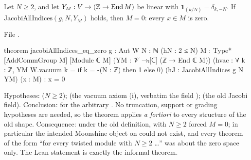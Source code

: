 \begin{theorem}\label{ch06:thm:defect}
Let $N\ge2$, and let $Y_M:V\to({\mathbb{Z}}\to\operatorname{End} M)$ be linear with $\mathbf 1_{(k/N)}=\delta_{k,-N}$.  If
$\mathrm{JacobiAllIndices}(g,N,Y_M)$ holds, then $M=0$: every $x\in M$ is zero.
\end{theorem}
\noindent File .
\begin{leancode}
theorem jacobiAllIndices_eq_zero {g : Aut W} {N : ℕ} (hN : 2 ≤ N) {M : Type*}
    [AddCommGroup M] [Module ℂ M] (YM : 𝒱 →ₗ[ℂ] (ℤ → End ℂ M))
    (hvac : ∀ k : ℤ, YM W.vacuum k = if k = -(N : ℤ) then 1 else 0)
    (hJ : JacobiAllIndices g N YM) (x : M) : x = 0
\end{leancode}
\begin{dictionary}
Hypotheses:  ($N\ge2$);  (the vacuum axiom (i), verbatim the field
);  (the old Jacobi field).  Conclusion:  for the arbitrary
.  No truncation, support or grading hypotheses are needed, so the theorem applies
\emph{a fortiori} to every structure of the old shape.  Consequence: under the old definition,
 with $N\ge2$ forced $M=0$; in particular the intended Moonshine object
on  could not exist, and every theorem of the form ``for every twisted module with
$N\ge 2$ \dots'' was about the zero space only.  The Lean statement is exactly the informal
theorem.
\end{dictionary}

